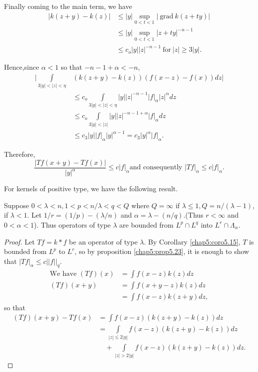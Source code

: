 Finally coming to the main term, we have 
\begin{align*}
  |k (z + y)- k (z) | & \leq |y| \sup_{0< t< 1} |~\text{grad}~ k (z + ty)|\\
  & \leq |y| \sup_{0< t< 1} |z + ty|^{-n-1}\\
  & \leq c_o |y| |z|^{-n-1} ~\text{for}~ |z| \geq 3 |y|.
\end{align*}

Hence,\pageoriginale since $\alpha < 1$ so that $-n -1 + \alpha < -n$, 
\begin{align*}
  |  \int\limits_{3 |y| < |z| < \eta} & (k (z+y) - k (z) ) (f (x-z) - f(x)) dz | \\
  & \leq c_o \int\limits_{3 |y| < |z| < \eta} |y| |z|^{-n-1}
  |f|_{\alpha} |z|^{\alpha} dz\\ 
  & \leq c_o \int\limits_{3 |y| < |z|} |y| |z|^{-n-1+\alpha} |f| _{\alpha} dz\\
  & \leq c_3 |y| |f|_\alpha |y| ^{\alpha -1} = c_3 |y|^{\alpha} |f|_{\alpha}.
\end{align*}

Therefore,
$$
\frac{|Tf (x+y) - Tf (x)|}{|y|^{\alpha}} \leq c |f|_{\alpha} \text{and
  consequently } |Tf | _{\alpha} \leq c |f|_{\alpha}. 
$$

For kernels of positive type, we have the following result.

\setcounter{thm}{24}
\begin{thm}\label{chap5:thm5.25}%
  Suppose $ 0 < \lambda < n,  1 < p < n/\lambda < q < Q$ where $Q
    = \infty $ if $ \lambda \leq 1,  Q = n/ (\lambda-1)$, if $\lambda
    < 1$.  Let $ 1/r = (1/p) - (\lambda /n)$ and $\alpha = \lambda -
    (n/q)$.(Thus $r < \infty$ and  $ 0 < \alpha < 1$). Thus operators
    of type $\lambda$ are bounded from $L^p \cap L^q$ into $L^r \cap
    \Lambda_{\alpha}$. 
\end{thm}

\begin{proof}
  Let $Tf = k * f$ be an operator of type $\lambda$. By Corollary
  \ref{chap5:coro5.15}, $T$ is bounded from $L^p $ to $L^r$, so by
  proposition \ref{chap5:prop5.23}, 
  it is enough to show that $|Tf|_{\alpha} \leq c || f || _q$. 
  \begin{align*}
    \text{We have } (Tf) (x) & = \int f (x-z) k (z) dz\\
    (Tf) (x+y) & = \int f (x + y -z) k (z) dz\\
    & = \int f (x-z) k (z+y) dz,
  \end{align*}
  so that
  \begin{align*}
    (Tf) (x+y) - Tf (x) & = \int f (x-z) (k (z+y) - k (z)) dz\\
    & = \int\limits_{|z| \leq 2 |y|} f (x-z) (k (z + y)- k (z)) dz\\
    & \quad +\int\limits_{|z| > 2 |y|} f (x-z) (k (z+y) - k (z)) dz. 
  \end{align*}\pageoriginale
\end{proof}

